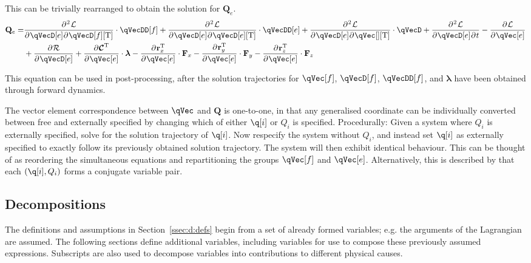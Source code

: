 \documentclass[11pt]{article}
\renewcommand{\secref}[1]{Section~\ref{#1}}
\newcommand{\pD}[2]{
    \frac{\partial\mspace{1mu}#1}{\partial\mspace{1mu}#2}
}
\newcommand{\pDD}[3]{
    \frac{\partial{^{\mspace{1mu}2}}\mspace{1mu}#1}{\partial\mspace{1mu}#2\mspace{1mu}\partial\mspace{1mu}#3}
}
\begin{document}
This can be trivially rearranged to obtain the solution for $\mathbf{Q}_e$.
\begin{align}
    \mathbf{Q}_e =
    &\pDD{\mathcal{L}}{\qVecD[e]}{\qVecD[f][\mathrm{T}]} \cdot \qVecDD[f]
    + \pDD{\mathcal{L}}{\qVecD[e]}{\qVecD[e][\mathrm{T}]} \cdot \qVecDD[e]
    + \pDD{\mathcal{L}}{\qVecD[e]}{\qVec[][\mathrm{T}]} \cdot \qVecD
    + \pDD{\mathcal{L}}{\qVecD[e]}{t}
    - \pD{\mathcal{L}}{\qVec[e]} \nonumber\\
    &+ \pD{\mathcal{R}}{\qVecD[e]}
    + \pD{\bm{\mathcal{C}}^{\mathrm{T}}}{\qVec[e]} \cdot \bm{\lambda}
    - \pD{\mathbf{r}_x^{\mathrm{T}}}{\qVec[e]} \cdot \mathbf{F}_x
    - \pD{\mathbf{r}_y^{\mathrm{T}}}{\qVec[e]} \cdot \mathbf{F}_y
    - \pD{\mathbf{r}_z^{\mathrm{T}}}{\qVec[e]} \cdot \mathbf{F}_z
\end{align}

This equation can be used in post-processing, after the solution trajectories for $\qVec[f]$, $\qVecD[f]$, $\qVecDD[f]$, and $\bm{\lambda}$ have been obtained through forward dynamics.

The vector element correspondence between $\qVec$ and $\mathbf{Q}$ is one-to-one, in that any generalised coordinate can be individually converted between free and externally specified by changing which of either $\q[i]$ or $Q_i$ is specified. Procedurally: Given a system where $Q_i$ is externally specified, solve for the solution trajectory of $\q[i]$. Now respecify the system without $Q_i$, and instead set $\q[i]$ as externally specified to exactly follow its previously obtained solution trajectory. The system will then exhibit identical behaviour. This can be thought of as reordering the simultaneous equations and repartitioning the groups $\qVec[f]$ and $\qVec[e]$. Alternatively, this is described by that each $(\q[i], Q_i)$ forms a conjugate variable pair.


\subsection{Decompositions} \label{sssec:d:decomposition}
The definitions and assumptions in \secref{ssec:d:defs} begin from a set of already formed variables; e.g. the arguments of the Lagrangian are assumed. The following sections define additional variables, including variables for use to compose these previously assumed expressions. Subscripts are also used to decompose variables into contributions to different physical causes.
\end{document}
